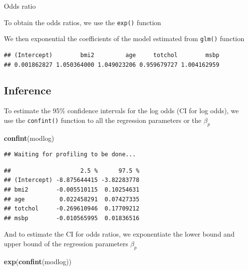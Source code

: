\documentclass[]{book}
\newenvironment{Shaded}{\begin{snugshade}}{\end{snugshade}}
\newcommand{\KeywordTok}[1]{\textcolor[rgb]{0.13,0.29,0.53}{\textbf{#1}}}
\newcommand{\OperatorTok}[1]{\textcolor[rgb]{0.81,0.36,0.00}{\textbf{#1}}}
\newcommand{\NormalTok}[1]{#1}
\theoremstyle{definition}
\theoremstyle{definition}
\theoremstyle{remark}
\begin{document}
Odds ratio

To obtain the odds ratios, we use the \texttt{exp()} function

We then exponential the coefficients of the model estimated from
\texttt{glm()} function

\begin{Shaded}
\end{Shaded}

\begin{verbatim}
## (Intercept)        bmi2         age     totchol        msbp 
## 0.001862827 1.050364000 1.049023206 0.959679727 1.004162959
\end{verbatim}

\subsection{Inference}\label{inference-1}

To estimate the 95\% confidence intervals for the log odds (CI for log
odds), we use the \texttt{confint()} function to all the regression
parameters or the \(\beta_p\)

\begin{Shaded}
\begin{Highlighting}[]
\KeywordTok{confint}\NormalTok{(modlog)}
\end{Highlighting}
\end{Shaded}

\begin{verbatim}
## Waiting for profiling to be done...
\end{verbatim}

\begin{verbatim}
##                    2.5 %      97.5 %
## (Intercept) -8.875644415 -3.82283778
## bmi2        -0.005510115  0.10254631
## age          0.022458291  0.07427335
## totchol     -0.269610946  0.17709212
## msbp        -0.010565995  0.01836516
\end{verbatim}

And to estimate the CI for odds ratios, we exponentiate the lower bound
and upper bound of the regression parameters \(\beta_p\)

\begin{Shaded}
\begin{Highlighting}[]
\KeywordTok{exp}\NormalTok{(}\KeywordTok{confint}\NormalTok{(modlog))}
\end{Highlighting}
\end{Shaded}
\end{document}
